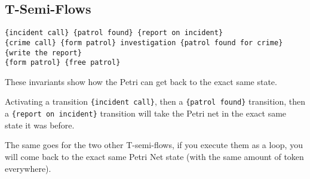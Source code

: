 \subsection{T-Semi-Flows}

\begin{lstlisting}
{incident call} {patrol found} {report on incident}
{crime call} {form patrol} investigation {patrol found for crime} {write the report}
{form patrol} {free patrol}
\end{lstlisting}

These invariants show how the Petri can get back to the exact same state. \newline

Activating a transition \verb#{incident call}#, then a \verb#{patrol found}#
transition, then a \verb#{report on incident}# transition will take the Petri
net in the exact same state it was before. \newline

The same goes for the two other T-semi-flows, if you execute them as a loop,
you will come back to the exact same Petri Net state (with the same amount of
token everywhere). \newline
